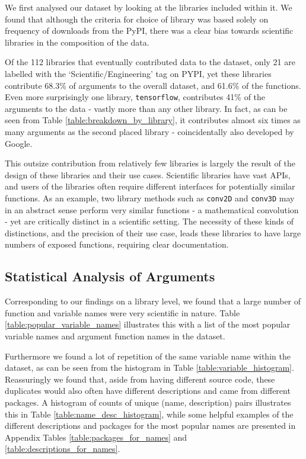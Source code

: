 We first analysed our dataset by looking at the libraries included within it.
We found that although the criteria for choice of library was based solely on frequency of downloads from the PyPI, there was a clear bias towards scientific libraries in the composition of the data.

Of the 112 libraries that eventually contributed data to the dataset, only 21 are labelled with the `Scientific/Engineering' tag on PYPI, yet these libraries contribute 68.3\% of arguments to the overall dataset, and 61.6\% of the functions. 
Even more surprisingly one library, \texttt{tensorflow}, contributes 41\% of the arguments to the data - vastly more than any other library.
In fact, as can be seen from Table \ref{table:breakdown_by_library}, it contributes almost six times as many arguments as the second placed library - coincidentally also developed by Google. 

This outsize contribution from relatively few libraries is largely the result of the design of these libraries and their use cases. 
Scientific libraries have vast APIs, and users of the libraries often require different interfaces for potentially similar functions. 
As an example, two library methods such as \texttt{conv2D} and \texttt{conv3D} may in an abstract sense perform very similar functions - a mathematical convolution - yet are critically distinct in a scientific setting.
The necessity of these kinds of distinctions, and the precision of their use case, leads these libraries to have large numbers of exposed functions, requiring clear documentation.

\subsection{Statistical Analysis of Arguments}

Corresponding to our findings on a library level, we found that a large number of function and variable names were very scientific in nature. Table \ref{table:popular_variable_names} illustrates this with a list of the most popular variable names and argument function names in the dataset.

Furthermore we found a lot of repetition of the same variable name within the dataset, as can be seen from the histogram in Table \ref{table:variable_histogram}.
Reassuringly we found that, aside from having different source code, these duplicates would also often have different descriptions and came from different packages.  A histogram of counts of unique (name, description) pairs illustrates this in Table \ref{table:name_desc_histogram}, while some helpful examples of the different descriptions and packages for the most popular names are presented in Appendix Tables \ref{table:packages_for_names} and \ref{table:descriptions_for_names}. 

